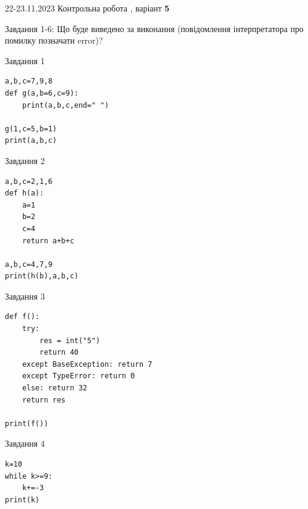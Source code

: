 \documentclass[12pt, ukrainian]{article}
\begin{document}
{{22-23.11.2023 Контрольна робота , варіант  \No \textbf { 5 }\par}}
{

Завдання 1-6: Що буде виведено за виконання (повідомлення інтерпретатора про помилку позначати error)?


\begin{minipage}[t]{9.7cm}                
{\begin{center}Завдання {1}\end{center}}
\begin{verbatim}
a,b,c=7,9,8
def g(a,b=6,c=9):
    print(a,b,c,end=" ")

g(1,c=5,b=1)
print(a,b,c)
\end{verbatim}     
\end{minipage}
\vline \hspace{8mm}
\begin{minipage}[t]{8.0cm}                
{\begin{center}Завдання {2}\end{center}}
\begin{verbatim}
a,b,c=2,1,6
def h(a):
    a=1
    b=2
    c=4
    return a+b+c

a,b,c=4,7,9
print(h(b),a,b,c)
\end{verbatim}     
\end{minipage}

\vspace{15mm}
\begin{minipage}[t]{9.7cm}                
{\begin{center}Завдання {3}\end{center}}
\begin{verbatim}
def f():
    try:
        res = int("5")
        return 40
    except BaseException: return 7
    except TypeError: return 0
    else: return 32
    return res

print(f())
\end{verbatim}     
\end{minipage}
\vline \hspace{8mm}
\begin{minipage}[t]{8.0cm}                
{\begin{center}Завдання {4}\end{center}}
\begin{verbatim}
k=10
while k>=9:
    k+=-3
print(k)
\end{verbatim}     
\end{minipage}

}
\end{document}
